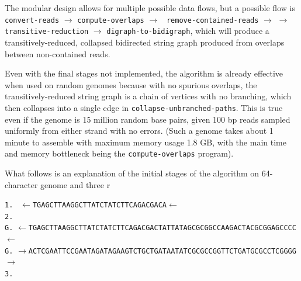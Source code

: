 \documentclass[letterpaper,12pt]{article}
\begin{document}
The modular design allows for multiple possible data flows, but a possible flow
is {\tt convert-reads} $\to$ {\tt compute-overlaps} $\to$ {\tt
remove-contained-reads} $\to$  $\to$ {\tt
transitive-reduction} $\to$ {\tt digraph-to-bidigraph}, which will produce a
transitively-reduced, collapsed bidirected string graph produced from overlaps
between non-contained reads.

Even with the final stages not implemented, the algorithm is already effective
when used on random genomes because with no spurious overlaps, the
transitively-reduced string graph is a chain of vertices with no branching,
which then collapses into a single edge in {\tt collapse-unbranched-paths}.
This is true even if the genome is 15 million random base pairs, given 100 bp
reads sampled uniformly from either strand with no errors.  (Such a genome takes
about 1 minute to assemble with maximum memory usage 1.8 GB, with the main time
and memory bottleneck being the {\tt compute-overlaps} program).

What follows is an explanation of the initial stages of the algorithm on
64-character genome and three r

\noindent
{\tt 1.}
{\tt \color{red} $\leftarrow$TGAGCTTAAGGCTTATCTATCTTCAGACGACA$\leftarrow$ }\\
{\tt 2.}
\\
{\tt G.}
{\tt $\leftarrow$TGAGCTTAAGGCTTATCTATCTTCAGACGACTATTATAGCGCGGCCAAGACTACGCGGAGCCCC$\leftarrow$} \\
{\tt G.}
{\tt $\rightarrow$ACTCGAATTCCGAATAGATAGAAGTCTGCTGATAATATCGCGCCGGTTCTGATGCGCCTCGGGG$\rightarrow$} \\
{\tt 3.}
\end{document}
